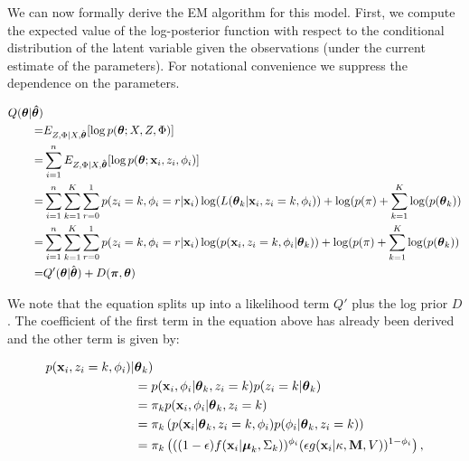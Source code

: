 \documentclass[12pt,english]{article}\usepackage[]{graphicx}\usepackage[]{color}
\begin{document}
We can now formally derive the EM algorithm for this model. First, we
compute the expected value of the log-posterior function with respect
to the conditional distribution of the latent variable given the
observations (under the current estimate of the parameters). For
notational convenience we suppress the dependence on the parameters.

\begin{equation}
\begin{split}
Q(\boldsymbol{\theta}| \boldsymbol{\hat{\theta}}) & \\
= & E_{Z,\Phi|X, \hat{\boldsymbol{\theta}}}[\log p(\boldsymbol{\theta};X,Z,\Phi)] \\
= & \sum_{i=1}^{n} E_{Z,\Phi|X, \hat{\boldsymbol{\theta}}}[\log p(\boldsymbol{\theta}; {\bf x}_i,z_i,\phi_i)] \\
= & \sum_{i=1}^{n} \sum_{k=1}^{K}\sum_{r = 0}^{1}p(z_i = k, \phi_i = r|{\bf x}_i) \log(L(\boldsymbol{\theta}_k|{\bf x}_i, z_i = k, \phi_i))  + \log(p(\pi) + \sum_{k=1}^{K}\log(p(\boldsymbol{\theta}_k))\\
= & \sum_{i=1}^{n} \sum_{k=1}^{K}\sum_{r = 0}^{1}p(z_i = k, \phi_i = r|{\bf x}_i) \log(p({\bf x}_i, z_i = k , \phi_i|\boldsymbol{\theta}_k))  + \log(p(\pi) + \sum_{k=1}^{K}\log(p(\boldsymbol{\theta}_k))\\
= & Q'(\boldsymbol{\theta}| \hat{\boldsymbol{\theta}}) + D(\boldsymbol{\pi},\boldsymbol{\theta})
\end{split}
\end{equation}

We note that the equation splits up into a likelihood term $Q'$ plus
the log prior $D$. The coefficient of the first term in the equation
above has already been derived and the other term is given by:

\begin{equation}
\begin{split}
p({\bf x}_i, z_i = k , \phi_i)|&\boldsymbol{\theta}_k) \\
&=  p({\bf x}_i,\phi_i|\boldsymbol{\theta}_k,z_i=k)p(z_i=k|\boldsymbol{\theta}_k) \\
 & = \pi_k p({\bf x}_i,\phi_i|\boldsymbol{\theta}_k,z_i=k)\\
 & =\pi_k \left(p({\bf x}_i|\boldsymbol{\theta}_k,z_i=k, \phi_i)p(\phi_i|\boldsymbol{\theta}_k,z_i=k)\right)\\
 & = \pi_k \left(((1 - \epsilon)f({\bf x}_i|\boldsymbol{\mu}_k, \Sigma_k))^{\phi_i}(\epsilon g({\bf x}_i|\kappa, {\bf M}, V))^{1-\phi_i}\right),
\end{split}
\end{equation}
\end{document}
